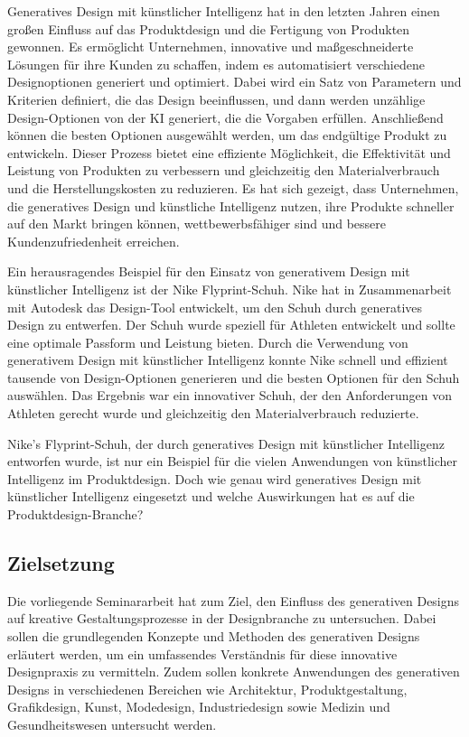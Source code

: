Generatives Design mit künstlicher Intelligenz hat in den letzten Jahren einen großen Einfluss auf das Produktdesign und 
die Fertigung von Produkten gewonnen. Es ermöglicht Unternehmen, innovative und maßgeschneiderte Lösungen für ihre Kunden 
zu schaffen, indem es automatisiert verschiedene Designoptionen generiert und optimiert. Dabei wird ein Satz von Parametern 
und Kriterien definiert, die das Design beeinflussen, und dann werden unzählige Design-Optionen von der KI generiert, die die 
Vorgaben erfüllen. Anschließend können die besten Optionen ausgewählt werden, um das endgültige Produkt zu entwickeln.
Dieser Prozess bietet eine effiziente Möglichkeit, die Effektivität und Leistung von Produkten zu verbessern und gleichzeitig 
den Materialverbrauch und die Herstellungskosten zu reduzieren. Es hat sich gezeigt, dass Unternehmen, die generatives Design 
und künstliche Intelligenz nutzen, ihre Produkte schneller auf den Markt bringen können, wettbewerbsfähiger sind und bessere 
Kundenzufriedenheit erreichen.

Ein herausragendes Beispiel für den Einsatz von generativem Design mit künstlicher Intelligenz ist der Nike Flyprint-Schuh. 
Nike hat in Zusammenarbeit mit Autodesk das Design-Tool entwickelt, um den Schuh durch generatives Design zu entwerfen. Der 
Schuh wurde speziell für Athleten entwickelt und sollte eine optimale Passform und Leistung bieten. Durch die Verwendung von 
generativem Design mit künstlicher Intelligenz konnte Nike schnell und effizient tausende von Design-Optionen generieren und 
die besten Optionen für den Schuh auswählen. Das Ergebnis war ein innovativer Schuh, der den Anforderungen von Athleten gerecht
 wurde und gleichzeitig den Materialverbrauch reduzierte. 

Nike's Flyprint-Schuh, der durch generatives Design mit künstlicher Intelligenz entworfen wurde, ist nur ein Beispiel für die 
vielen Anwendungen von künstlicher Intelligenz im Produktdesign. Doch wie genau wird generatives Design mit künstlicher Intelligenz
eingesetzt und welche Auswirkungen hat es auf die Produktdesign-Branche?

\subsection*{Zielsetzung}
Die vorliegende Seminararbeit hat zum Ziel, den Einfluss des generativen Designs auf kreative Gestaltungsprozesse in der Designbranche zu untersuchen. Dabei sollen die grundlegenden Konzepte und Methoden des generativen Designs erläutert werden, um ein umfassendes Verständnis für diese innovative Designpraxis zu vermitteln. Zudem sollen konkrete Anwendungen des generativen Designs in verschiedenen Bereichen wie Architektur, Produktgestaltung, Grafikdesign, Kunst, Modedesign, Industriedesign sowie Medizin und Gesundheitswesen untersucht werden. 

